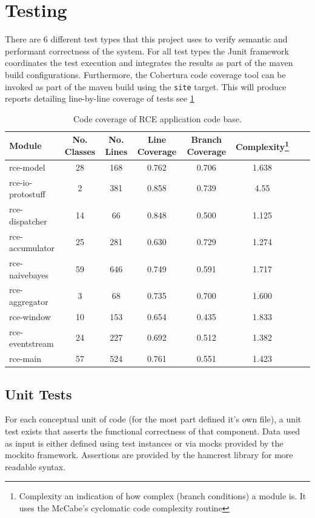 \documentclass[a4paper,11pt]{scrreprt}
\begin{document}
\section{Testing}
There are 6 different test types that this project uses to verify semantic and performant correctness of the system. For all test types the Junit framework coordinates the test execution and integrates the results as part of the maven build configurations. Furthermore, the Cobertura code coverage tool can be invoked as part of the maven build using the \verb|site| target. This will produce reports detailing line-by-line coverage of tests see \ref{tab:coverage}
\begin{table}[h!]
\begin{tabular}{l*{6}{c}r}
Module              & No. Classes & No. Lines & Line Coverage & Branch Coverage & Complexity\footnote{Complexity an indication of how complex (branch conditions) a module is. It uses the McCabe's cyclomatic code complexity routine\cite{mccabecc}} \\
\hline
rce-model & 28 & 168 & 0.762 & 0.706 & 1.638 \\
rce-io-protostuff & 2 & 381 & 0.858 & 0.739 & 4.55 \\
rce-dispatcher & 14 & 66 & 0.848 & 0.500 & 1.125 \\
rce-accumulator & 25 & 281 & 0.630 & 0.729 & 1.274 \\
rce-naivebayes & 59 & 646 & 0.749 & 0.591 & 1.717 \\
rce-aggregator & 3 & 68 & 0.735 & 0.700 & 1.600 \\
rce-window & 10 & 153 & 0.654 & 0.435 & 1.833 \\
rce-eventstream & 24 & 227 & 0.692 & 0.512 & 1.382 \\
rce-main & 57 & 524 & 0.761 & 0.551 & 1.423 \\
\end{tabular}
\caption{Code coverage of RCE application code base.}
\label{tab:coverage}
\end{table}

\subsection{Unit Tests}
For each conceptual unit of code (for the most part defined it's own file), a unit test exists that asserts the functional correctness of that component. Data used as input is either defined using test instances or via mocks provided by the mockito framework. Assertions are provided by the hamcrest library for more readable syntax.
\end{document}
